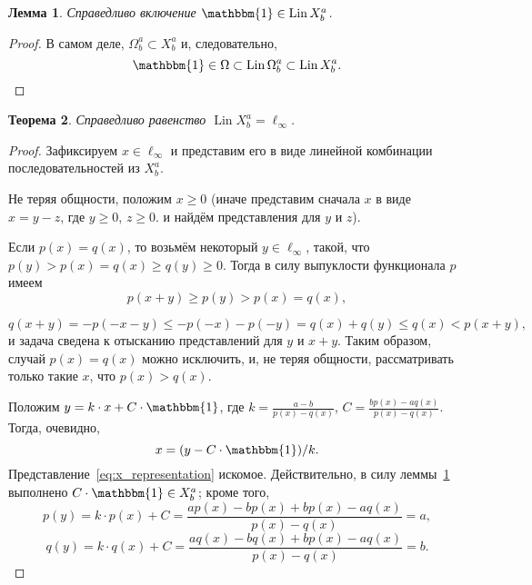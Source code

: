 \documentclass[a4paper,14pt]{article} %
\theoremstyle{plain}
\newtheorem{lemma}{Лемма}[section]
\newtheorem{theorem}[lemma]{Теорема}
\begin{document}
\begin{lemma}
	\label{lem:const_Lin_ell_infty}
	Справедливо включение
	$\mathbbm{1}\in \operatorname{Lin} X^a_b$.
\end{lemma}

\begin{proof}
	В самом деле,
	$\Omega^a_b \subset X^a_b$
	и, следовательно,
	\begin{equation}
		\mathbbm{1} \in \Omega \subset \operatorname{Lin} \Omega^a_b \subset \operatorname{Lin} X^a_b
		.
	\end{equation}
\end{proof}

\begin{theorem}
	\label{thm:Lin_ell_infty}
	Справедливо равенство $\operatorname{Lin} X^a_b = \ell_\infty$.
\end{theorem}

\begin{proof}
	Зафиксируем $x \in \ell_\infty$ и представим его в виде линейной комбинации последовательностей из $X^a_b$.

	Не теряя общности, положим $x\geq 0$
	(иначе представим сначала $x$ в виде $x = y - z$, где $y \geq 0$, $z \geq 0$.
	и найдём представления для $y$ и $z$).

	Если $p(x) = q(x)$, то возьмём некоторый $y\in\ell_\infty$,
	такой, что $p(y) > p(x) = q(x)  \geq q(y) \geq 0$.
	Тогда в силу выпуклости функционала $p$ имеем
	\begin{equation}
		p(x+y) \geq p(y) > p(x) = q(x)
		,
	\end{equation}


	\begin{equation}
		q(x+y) = -p(-x-y) \leq -p(-x) -p(-y) = q(x) + q(y) \leq q(x) < p(x+y)
		,
	\end{equation}
	и задача сведена к отысканию представлений для $y$ и $x+y$.
	Таким образом, случай $p(x) = q(x)$ можно исключить,
	и, не теряя общности, рассматривать только такие $x$, что $p(x) > q(x)$.

	Положим $y=k\cdot x + C\cdot\mathbbm{1}$,
	где $k=\frac{a-b}{p(x)-q(x)}$, $C=\frac{bp(x)-aq(x)}{p(x)-q(x)}$.
	Тогда, очевидно,
	\begin{equation}
		\label{eq:x_representation}
		x=(y-C\cdot\mathbbm{1})/k
		.
	\end{equation}
	Представление~\eqref{eq:x_representation} искомое.
	Действительно, в силу леммы~\ref{lem:const_Lin_ell_infty} выполнено
	$C\cdot\mathbbm{1}\in X^a_b$; кроме того,
	\begin{equation}
		p(y) = k\cdot p(x) + C
		=
		\frac{ap(x)-bp(x)+bp(x)-aq(x)}{p(x)-q(x)}
		=
		a
		,
	\end{equation}
	\begin{equation}
		q(y) = k\cdot q(x) + C
		=
		\frac{aq(x)-bq(x)+bp(x)-aq(x)}{p(x)-q(x)}
		=
		b
		.
	\end{equation}
\end{proof}
\end{document}
